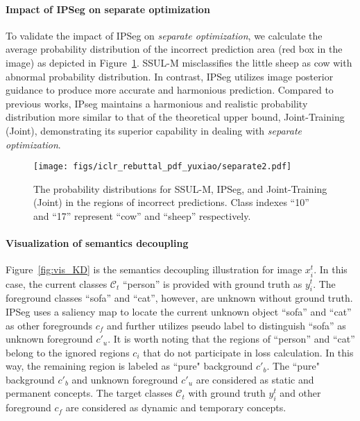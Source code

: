 \paragraph{Impact of IPSeg on separate optimization}To validate the impact of IPSeg on \textit{separate optimization}, we calculate the average probability distribution of the incorrect prediction area (red box in the image) as depicted in Figure~\ref{fig:distribution}. SSUL-M misclassifies the little sheep as cow with abnormal probability distribution. In contrast,  IPSeg utilizes image posterior guidance to produce more accurate and harmonious prediction. Compared to previous works, IPseg maintains a harmonious and realistic probability distribution more similar to that of the theoretical upper bound, Joint-Training (Joint), demonstrating its superior capability in dealing with \textit{separate optimization}.

\begin{figure}[t]
    \centering
    \texttt{[image: figs/iclr\_rebuttal\_pdf\_yuxiao/separate2.pdf]}
    \caption{The probability distributions for SSUL-M, IPSeg, and Joint-Training (Joint) in the regions of incorrect predictions. Class indexes ``10'' and ``17'' represent ``cow'' and ``sheep'' respectively.}
    \label{fig:distribution}
\end{figure}






\paragraph{Visualization of semantics decoupling} Figure~\ref{fig:vis_KD} is the semantics decoupling illustration for image \(x^t_i\). In this case, the current classes \(\mathcal{C}_t\) ``person'' is provided with ground truth as \(y^t_i\). The foreground classes ``sofa'' and ``cat'', however, are unknown without ground truth. IPSeg uses a saliency map to locate the current unknown object ``sofa'' and ``cat'' as other foregrounds \(c_f\) and further utilizes pseudo label to distinguish ``sofa'' as unknown foreground \(c'_u\). It is worth noting that the regions of ``person'' and ``cat'' belong to the ignored regions \(c_i\) that do not participate in loss calculation. In this way, the remaining region is labeled as ``pure" background \(c'_b\). The ``pure" background \(c'_b\) and unknown foreground \(c'_u\) are considered as static and permanent concepts. The target classes \(\mathcal{C}_t\) with ground truth \(y^t_i\) and other foreground \(c_f\) are considered as dynamic and temporary concepts. 

